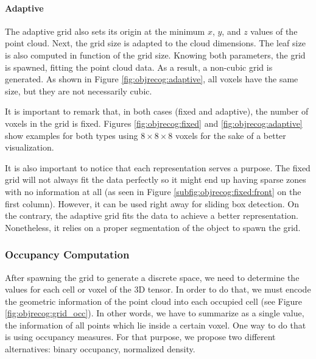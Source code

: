 \paragraph{Adaptive}

The adaptive grid also sets its origin at the minimum $x$, $y$, and $z$ values of the point cloud. Next, the grid size is adapted to the cloud dimensions. The leaf size is also computed in function of the grid size. Knowing both parameters, the grid is spawned, fitting the point cloud data. As a result, a non-cubic grid is generated. As shown in Figure \ref{fig:objrecog:adaptive}, all voxels have the same size, but they are not necessarily cubic.

It is important to remark that, in both cases (fixed and adaptive), the number of voxels in the grid is fixed. Figures \ref{fig:objrecog:fixed} and \ref{fig:objrecog:adaptive} show examples for both types using $8\times8\times8$ voxels for the sake of a better visualization.

It is also important to notice that each representation serves a purpose. The fixed grid will not always fit the data perfectly so it might end up having sparse zones with no information at all (as seen in Figure \ref{subfig:objrecog:fixed:front} on the first column). However, it can be used right away for sliding box detection. On the contrary, the adaptive grid fits the data to achieve a better representation. Nonetheless, it relies on a proper segmentation of the object to spawn the grid.

\subsubsection{Occupancy Computation}
\label{cha:objrecog:sec:study:subsec:representation:subsubsec:occupancy}

After spawning the grid to generate a discrete space, we need to determine the values for each cell or voxel of the \acs{3D} tensor. In order to do that, we must encode the geometric information of the point cloud into each occupied cell (see Figure \ref{fig:objrecog:grid_occ}). In other words, we have to summarize as a single value, the information of all points which lie inside a certain voxel. One way to do that is using occupancy measures. For that purpose, we propose two different alternatives: binary occupancy, normalized density.

